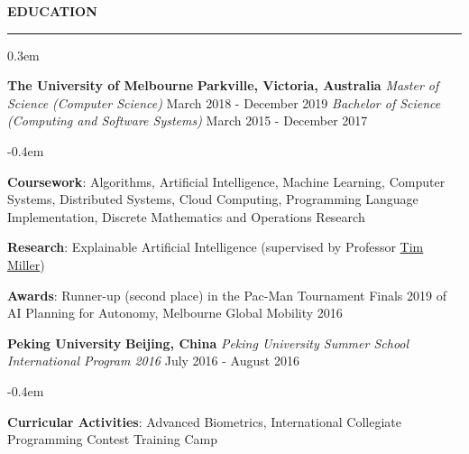 \documentclass{cv}
\begin{document}
\smallskip


\textbf{\uppercase{Education}}
\sectionlineskip
\hrule height 0.1em
\begin{list}{}{\setlength{\leftmargin}{0em}}
\itemsep 0.3em
\item
    \textbf{The University of Melbourne} \hfill \textbf{Parkville, Victoria, Australia}%
    \vspace{0.1em} \newline
    {\textit{Master of Science (Computer Science)}} \hfill {March 2018 - December 2019}%
    \newline
    {\textit{Bachelor of Science (Computing and Software Systems)}} \hfill {March 2015 - December 2017}%
    \begin{list}{\raisebox{0.2em}{\tiny$\bullet$} \hspace{0em}}{\setlength{\leftmargin}{1.2em}}
        \itemsep -0.4em \vspace{-0.4em}
        \item \textbf{Coursework}: Algorithms, Artificial Intelligence, Machine Learning, Computer Systems, Distributed Systems, Cloud Computing, Programming Language Implementation, Discrete Mathematics and Operations Research
        \item \textbf{Research}: Explainable Artificial Intelligence (supervised by Professor \href{https://eecs.uq.edu.au/profile/9477/tim-miller}{Tim Miller})
        \item \textbf{Awards}: Runner-up (second place) in the Pac-Man Tournament Finals 2019 of AI Planning for Autonomy, Melbourne Global Mobility 2016
    \end{list}
\item
    \textbf{Peking University} \hfill \textbf{Beijing, China}%
    \vspace{0.1em} \newline 
    {\textit{Peking University Summer School International Program 2016}} \hfill {July 2016 - August 2016}%
    \begin{list}{\raisebox{0.2em}{\tiny$\bullet$} \hspace{0em}}{\setlength{\leftmargin}{1.2em}}
        \itemsep -0.4em \vspace{-0.4em}
        \item \textbf{Curricular Activities}: Advanced Biometrics, International Collegiate Programming Contest Training Camp
    \end{list}
\end{list}
\end{document}
